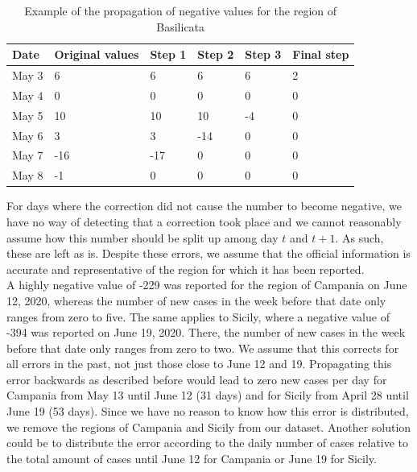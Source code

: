 \documentclass[12pt]{article}
\begin{document}
	\begin{table}[H]
		\centering
		\caption{Example of the propagation of negative values for the region of Basilicata}
		\label{tab:example_propagation_negative_values}
		\begin{tabular}{llllll}
			\toprule
			Date    & Original values   & Step 1 & Step 2 & Step 3 & Final step \\ \midrule
            May 3   & 6                 & 6      & 6      & 6      & 2          \\
            May 4   & 0                 & 0      & 0      & 0      & 0          \\
            May 5   & 10                & 10     & 10     & -4     & 0          \\
            May 6   & 3                 & 3      & -14    & 0      & 0          \\
            May 7   & -16               & -17    & 0      & 0      & 0          \\
            May 8   & -1                & 0      & 0      & 0      & 0          \\ \bottomrule
		\end{tabular}
	\end{table}
	
	For days where the correction did not cause the number to become negative, we have no way of detecting that a correction took place and we cannot reasonably assume how this number should be split up among day $t$ and $t+1$. As such, these are left as is. Despite these errors, we assume that the official information is accurate and representative of the region for which it has been reported. \\
	
	A highly negative value of -229 was reported for the region of Campania on June 12, 2020, whereas the number of new cases in the week before that date only ranges from zero to five. The same applies to Sicily, where a negative value of -394 was reported on June 19, 2020. There, the number of new cases in the week before that date only ranges from zero to two. We assume that this corrects for all errors in the past, not just those close to June 12 and 19. Propagating this error backwards as described before would lead to zero new cases per day for Campania from May 13 until June 12 (31 days) and for Sicily from April 28 until June 19 (53 days). Since we have no reason to know how this error is distributed, we remove the regions of Campania and Sicily from our dataset. Another solution could be to distribute the error according to the daily number of cases relative to the total amount of cases until June 12 for Campania or June 19 for Sicily. \\
	
\end{document}
